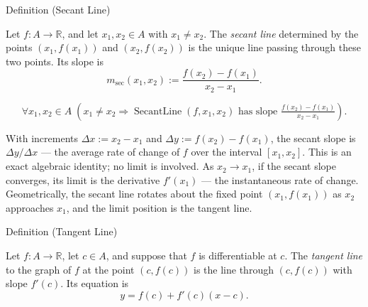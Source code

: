 
\begin{definitionbox}{Definition (Secant Line)}
\begin{definition}
\label{def:secant-line}
Let $f : A \to \mathbb{R}$, and let $x_1, x_2 \in A$ with $x_1 \neq x_2$. The \emph{secant line} determined by the points $(x_1, f(x_1))$ and $(x_2, f(x_2))$ is the unique line passing through these two points. Its slope is
\[
m_{\mathrm{sec}}(x_1, x_2) := \frac{f(x_2) - f(x_1)}{x_2 - x_1}.
\]
\end{definition}
\end{definitionbox}

\begin{remark*}
\[
\forall x_1, x_2 \in A\;(x_1 \neq x_2 \Rightarrow \operatorname{SecantLine}(f, x_1, x_2)
\text{ has slope } \tfrac{f(x_2)-f(x_1)}{x_2-x_1}).
\]
\end{remark*}

\begin{remark*}[Interpretation]
With increments $\Delta x := x_2 - x_1$ and $\Delta y := f(x_2) - f(x_1)$, the secant slope is $\Delta y / \Delta x$ --- the average rate of change of $f$ over the interval $[x_1, x_2]$. This is an exact algebraic identity; no limit is involved. As $x_2 \to x_1$, if the secant slope converges, its limit is the derivative $f'(x_1)$ --- the instantaneous rate of change. Geometrically, the secant line rotates about the fixed point $(x_1, f(x_1))$ as $x_2$ approaches $x_1$, and the limit position is the tangent line.
\end{remark*}

\NoLocalDependencies


\begin{definitionbox}{Definition (Tangent Line)}
\begin{definition}
\label{def:tangent-line}
Let $f : A \to \mathbb{R}$, let $c \in A$, and suppose that $f$ is differentiable at $c$. The \emph{tangent line} to the graph of $f$ at the point $(c, f(c))$ is the line through $(c, f(c))$ with slope $f'(c)$. Its equation is
\[
y = f(c) + f'(c)(x - c).
\]
\end{definition}
\end{definitionbox}

